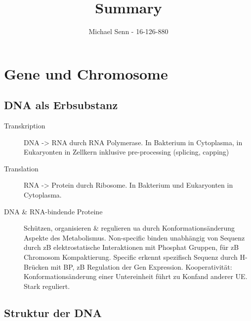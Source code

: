 \documentclass[a4paper,twocolumn,usegeometry,english,fontsize=6,DIV=16]{scrartcl}
\title{Summary}
\author{Michael Senn \maillink{michael.senn@students.unibe.ch} - 16-126-880}
\date{\printdate}
\begin{document}

\section{Gene und Chromosome}

\subsection{DNA als Erbsubstanz}

\begin{description}
	\item[Transkription] DNA -> RNA durch RNA Polymerase. In Bakterium in
		Cytoplasma, in Eukaryonten in Zellkern inklusive pre-processing
		(splicing, capping)
	\item[Translation] RNA -> Protein durch Ribosome. In Bakterium und
		Eukaryonten in Cytoplasma.
	\item[DNA \& RNA-bindende Proteine] Schützen, organisieren \&
		regulieren ua durch Konformationsänderung Aspekte des
		Metabolismus. Non-specific binden unabhängig von Sequenz durch
		zB elektrostatische Interaktionen mit Phosphat Gruppen, für zB
		Chromosom Kompaktierung. Specific erkennt spezifisch Sequenz
		durch H-Brücken mit BP, zB Regulation der Gen Expression.
		Kooperativität: Konformationsänderung einer Untereinheit führt
		zu Konfand anderer UE. Stark reguliert.
\end{description}

\subsection{Struktur der DNA}
\end{document}
